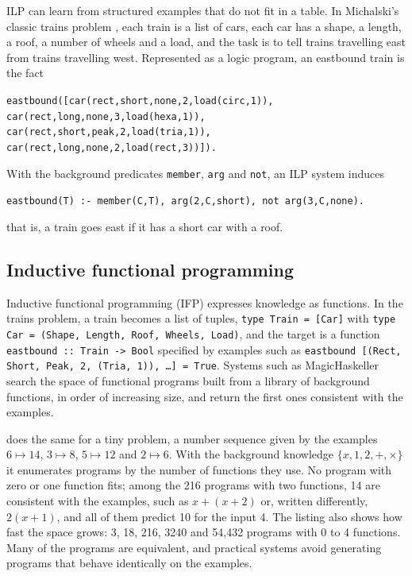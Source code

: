 ILP can learn from structured examples that do not fit in a table. In Michalski's classic trains problem
\citep{michalski1980pattern}, each train is a list of cars, each car has a shape, a length, a roof, a
number of wheels and a load, and the task is to tell trains travelling east from trains travelling
west. Represented as a logic program, an eastbound train is the fact
\begin{center}\small
\texttt{eastbound([car(rect,short,none,2,load(circ,1)), car(rect,long,none,3,load(hexa,1)),}\\
\texttt{car(rect,short,peak,2,load(tria,1)), car(rect,long,none,2,load(rect,3))]).}
\end{center}
With the background predicates \texttt{member}, \texttt{arg} and \texttt{not}, an ILP system induces
\begin{center}
\texttt{eastbound(T) :- member(C,T), arg(2,C,short), not arg(3,C,none).}
\end{center}
that is, a train goes east if it has a short car with a roof.

\subsection{Inductive functional programming}

Inductive functional programming (IFP) expresses knowledge as functions. In the trains problem, a train
becomes a list of tuples, \texttt{type Train = [Car]} with \texttt{type Car = (Shape, Length, Roof,
Wheels, Load)}, and the target is a function \texttt{eastbound :: Train -> Bool} specified by examples
such as \texttt{eastbound [(Rect, Short, Peak, 2, (Tria, 1)), \dots] = True}. Systems such as
MagicHaskeller \citep{katayama2008efficient} search the space of functional programs built from a library
of background functions, in order of increasing size, and return the first ones consistent with the
examples.

 does the same for a tiny problem, a number sequence given by the examples $6\mapsto14$,
$3\mapsto8$, $5\mapsto12$ and $2\mapsto6$. With the background knowledge $\{x,1,2,+,\times\}$ it
enumerates programs by the number of functions they use. No program with zero or one function fits;
among the 216 programs with two functions, 14 are consistent with the examples, such as
$x+(x+2)$ or, written differently, $2(x+1)$, and all of them predict 10 for the input 4. The listing also
shows how fast the space grows: 3, 18, 216, 3240 and 54,432 programs with 0 to 4 functions. Many of the
programs are equivalent, and practical systems avoid generating programs that behave identically on
the examples.

